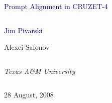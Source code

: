 \documentclass[compress]{beamer}
\begin{document}
\begin{frame}
\vfill
\begin{center}
\textcolor{darkblue}{\Large Prompt Alignment in CRUZET-4}

\vfill
\begin{columns}
\begin{center}
\large
\textcolor{darkblue}{Jim Pivarski}

\vspace{0.2 cm}
Alexei Safonov
\end{center}

\end{columns}

\begin{columns}
\begin{center}
\scriptsize
{\it Texas A\&M University}
\end{center}
\end{columns}

\vfill
28 August, 2008

\end{center}
\end{frame}

\end{document}
